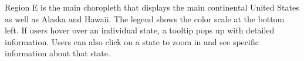 \documentclass{sigchi}
\begin{document}
Region E is the main choropleth that displays the main continental United States as well as Alaska and Hawaii. The legend shows the color scale at the bottom left. If users hover over an individual state, a tooltip pops up with detailed information. Users can also click on a state to zoom in and see specific information about that state.

%
%
%
%
\end{document}
